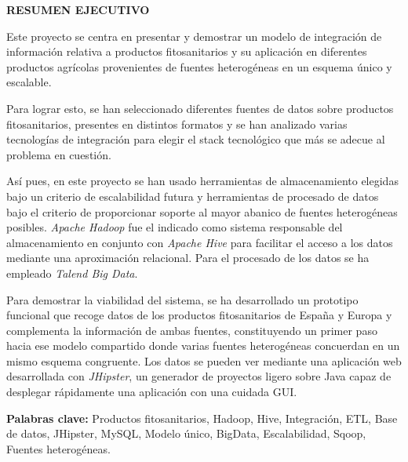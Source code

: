 \begin{center}

{\Large \bfseries RESUMEN EJECUTIVO}

\vspace{1.5cm}
\end{center}


Este proyecto se centra en presentar y demostrar un modelo de integración de información relativa a productos fitosanitarios y su aplicación en diferentes productos agrícolas provenientes de fuentes heterogéneas en un esquema único y escalable. \par
Para lograr esto, se han seleccionado diferentes fuentes de datos sobre productos fitosanitarios, presentes en distintos formatos y se han analizado varias tecnologías de integración para elegir el stack tecnológico que más se adecue al problema en cuestión.\par
Así pues, en este proyecto se han usado herramientas de almacenamiento elegidas bajo un criterio de escalabilidad futura y herramientas de procesado de datos bajo el criterio de proporcionar soporte al mayor abanico de fuentes heterogéneas posibles. \textit{Apache Hadoop} fue el indicado como sistema responsable del almacenamiento en conjunto con \textit{Apache Hive} para facilitar el acceso a los datos mediante una aproximación relacional. Para el procesado de los datos se ha empleado \textit{Talend Big Data}.\par
Para demostrar la viabilidad del sistema, se ha desarrollado un prototipo funcional que recoge datos de los productos fitosanitarios de España y Europa y complementa la información de ambas fuentes, constituyendo un primer paso hacia ese modelo compartido donde varias fuentes heterogéneas concuerdan en un mismo esquema congruente. Los datos se pueden ver mediante una aplicación web desarrollada con \textit{JHipster}, un generador de proyectos ligero sobre Java capaz de desplegar rápidamente una aplicación con una cuidada GUI.  \\\par

\textbf{Palabras clave:}  Productos fitosanitarios, Hadoop, Hive, Integración, ETL, Base de datos, JHipster, MySQL, Modelo único, BigData, Escalabilidad, Sqoop, Fuentes heterogéneas.

